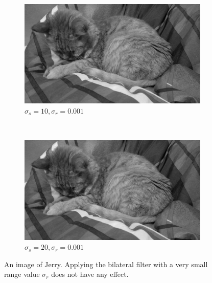 \documentclass[a4spaper]{article}
\begin{document}
\begin{figure}[ht]
	\vspace{2mm}
	\begin{subfigure}[h]{0.48\textwidth}
		\centering
		\includegraphics[width=\textwidth]{jerry_flt_10_0-001}
		\caption*{$\sigma_s = 10, \sigma_r = 0.001$}
	\end{subfigure}
	~
	\begin{subfigure}[h]{0.48\textwidth}
		\centering
		\includegraphics[width=\textwidth]{jerry_flt_20_0-001}
		\caption*{$\sigma_s = 20, \sigma_r = 0.001$}
	\end{subfigure}	
\caption{An image of Jerry. Applying the bilateral filter with a very small range value $\sigma_r$ does not have any effect.}
\label{fig:jerry_small_range}
\end{figure}
\end{document}
